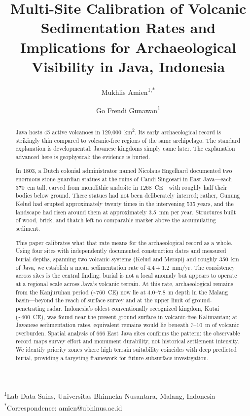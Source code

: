 \documentclass[12pt,a4paper]{article}
\begin{document}
\title{Multi-Site Calibration of Volcanic Sedimentation Rates and Implications for Archaeological Visibility in Java, Indonesia}

\author{Mukhlis Amien\textsuperscript{1,*} \and Go Frendi Gunawan\textsuperscript{1}}

\date{}

\maketitle

\noindent\textsuperscript{1}Lab Data Sains, Universitas Bhinneka Nusantara, Malang, Indonesia\\
\textsuperscript{*}Correspondence: amien@ubhinus.ac.id

\begin{abstract}
Java hosts 45 active volcanoes in 129,000~km\textsuperscript{2}. Its early archaeological record is strikingly thin compared to volcanic-free regions of the same archipelago. The standard explanation is developmental: Javanese kingdoms simply came later. The explanation advanced here is geophysical: the evidence is buried.

In 1803, a Dutch colonial administrator named Nicolaus Engelhard documented two enormous stone guardian statues at the ruins of Candi Singosari in East Java---each 370~cm tall, carved from monolithic andesite in 1268~CE---with roughly half their bodies below ground. These statues had not been deliberately interred; rather, Gunung Kelud had erupted approximately twenty times in the intervening 535 years, and the landscape had risen around them at approximately 3.5~mm per year. Structures built of wood, brick, and thatch left no comparable marker above the accumulating sediment.

This paper calibrates what that rate means for the archaeological record as a whole. Using four sites with independently documented construction dates and measured burial depths, spanning two volcanic systems (Kelud and Merapi) and roughly 350~km of Java, we establish a mean sedimentation rate of $4.4 \pm 1.2$~mm/yr. The consistency across sites is the central finding: burial is not a local anomaly but appears to operate at a regional scale across Java's volcanic terrain. At this rate, archaeological remains from the Kanjuruhan period (\textasciitilde760~CE) now lie at 4.0--7.8~m depth in the Malang basin---beyond the reach of surface survey and at the upper limit of ground-penetrating radar. Indonesia's oldest conventionally recognized kingdom, Kutai (\textasciitilde400~CE), was found near the present ground surface in volcanic-free Kalimantan; at Javanese sedimentation rates, equivalent remains would lie beneath 7--10~m of volcanic overburden. Spatial analysis of 666 East Java sites confirms the pattern: the observable record maps survey effort and monument durability, not historical settlement intensity. We identify priority zones where high terrain suitability coincides with deep predicted burial, providing a targeting framework for future subsurface investigation.
\end{abstract}
\end{document}
